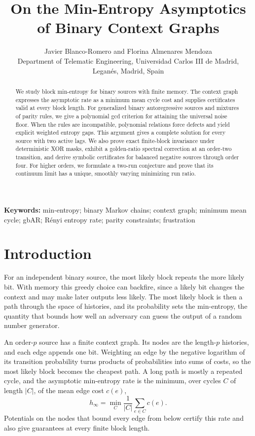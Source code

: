 \documentclass[11pt,a4paper]{article}
\title{On the Min-Entropy Asymptotics of Binary Context Graphs}
\author{Javier Blanco-Romero and Florina Almenares Mendoza\\\small Department of Telematic Engineering, Universidad Carlos III de Madrid,\\Legan\'es, Madrid, Spain}
\date{}
\begin{document}
\maketitle
\begin{abstract}
We study block min-entropy for binary sources with finite memory.
The context graph expresses the asymptotic rate as a minimum mean
cycle cost and supplies certificates valid at every block length.
For generalized binary autoregressive sources and mixtures of parity
rules, we give a polynomial gcd criterion for attaining the universal
noise floor.  When the rules are incompatible, polynomial relations
force defects and yield explicit weighted entropy gaps.  This argument
gives a complete solution for every source with two active lags.
We also prove exact finite-block invariance under deterministic XOR
masks, exhibit a golden-ratio spectral correction at an order-two
transition, and derive symbolic certificates for balanced negative
sources through order four.  For higher orders, we formulate a
two-run conjecture and prove that its continuum limit has a unique,
smoothly varying minimizing run ratio.
\end{abstract}

\noindent\textbf{Keywords:} min-entropy; binary Markov chains; context graph; minimum mean cycle; gbAR; R\'enyi entropy rate; parity constraints; frustration

\section{Introduction}
\label{sec:introduction}

For an independent binary source, the most likely block repeats the
more likely bit.  With memory this greedy choice can backfire, since a
likely bit changes the context and may make later outputs less likely.
The most likely block is then a path through the space of histories,
and its probability sets the min-entropy, the quantity that bounds how
well an adversary can guess the output of a random number generator.

An order-$p$ source has a finite context graph.  Its nodes are the
length-$p$ histories, and each edge appends one bit.  Weighting an edge
by the negative logarithm of its transition probability turns products
of probabilities into sums of costs, so the most likely block becomes
the cheapest path.  A long path is mostly a repeated cycle, and the
asymptotic min-entropy rate is the minimum, over cycles $C$ of length $|C|$, of the mean edge cost $c(e)$,
\[
    h_\infty=\min_C\frac{1}{|C|}\sum_{e\in C}c(e).
\]
Potentials on the nodes that bound every edge from below certify this
rate and also give guarantees at every finite block length.
\end{document}
